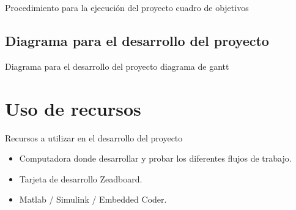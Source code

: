 \documentclass[10pt,aspectratio=169]{beamer} %
\begin{document}
\begin{frame}{Procedimiento para la ejecución del proyecto}
  cuadro de objetivos
\end{frame}


\subsection{Diagrama para el desarrollo del proyecto}

\begin{frame}{Diagrama para el desarrollo del proyecto}
  diagrama de gantt
\end{frame}

\section{Uso de recursos}

\begin{frame}{Recursos a utilizar en el desarrollo del proyecto}
  \begin{itemize}
    \item Computadora donde desarrollar y probar los diferentes flujos de trabajo.
    \item Tarjeta de desarrollo Zeadboard.
    \item Matlab / Simulink / Embedded Coder.
  \end{itemize}
\end{frame}
\end{document}
